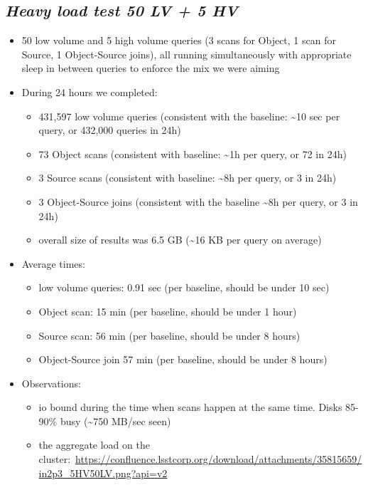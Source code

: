 \documentclass[DM,toc]{lsstdoc}
\begin{document}
\subsection{\texorpdfstring{\textbf{\emph{Heavy load test 50 LV + 5
HV}}}{Heavy load test 50 LV + 5 HV}}\label{heavy-load-test-50-lv-5-hv}

\begin{itemize}
\item
  50 low volume and 5 high volume queries (3 scans for Object, 1 scan
  for Source, 1 Object-Source joins), all running simultaneously with
  appropriate sleep in between queries to enforce the mix we were aiming
\item
  During 24 hours we completed:

  \begin{itemize}
  \item
    431,597 low volume queries (consistent with the baseline:
    \textasciitilde{}10 sec per query, or 432,000 queries in 24h)
  \item
    73 Object scans (consistent with baseline: \textasciitilde{}1h per
    query, or 72 in 24h)
  \item
    3 Source scans (consistent with baseline: \textasciitilde{}8h per
    query, or 3 in 24h)
  \item
    3 Object-Source joins (consistent with the baseline
    \textasciitilde{}8h per query, or 3 in 24h)
  \item
    overall size of results was 6.5 GB (\textasciitilde{}16 KB per query
    on average)
  \end{itemize}
\item
  Average times:

  \begin{itemize}
  \item
    low volume queries: 0.91 sec (per baseline, should be under 10 sec)
  \item
    Object scan: 15 min (per baseline, should be under 1 hour)
  \item
    Source scan: 56 min (per baseline, should be under 8 hours)
  \item
    Object-Source join 57 min (per baseline, should be under 8 hours)
  \end{itemize}
\item
  Observations:

  \begin{itemize}
  \item
    io bound during the time when scans happen at the same time. Disks
    85-90\% busy (\textasciitilde{}750 MB/sec seen)
  \item
    the aggregate load on the
    cluster:~\url{https://confluence.lsstcorp.org/download/attachments/35815659/in2p3_5HV50LV.png?api=v2}
  \end{itemize}
\end{itemize}
\end{document}
